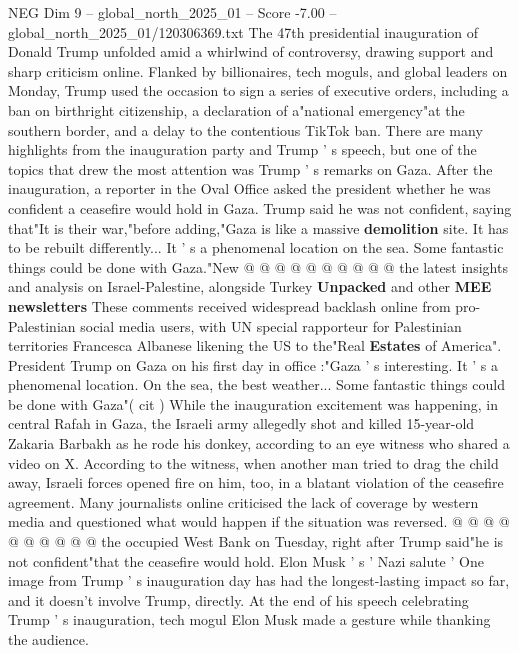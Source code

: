 \begin{textsample}{NEG Dim 9 – global\_north\_2025\_01 – Score -7.00 – global\_north\_2025\_01/120306369.txt}  \label{ex:f9_neg_096}
The 47th presidential inauguration of Donald Trump unfolded amid a whirlwind of controversy, drawing support and sharp criticism online.
Flanked by billionaires, tech moguls, and global leaders on Monday, Trump used the occasion to sign a series of executive orders, including a ban on birthright citizenship, a declaration of a"national emergency"at the southern border, and a delay to the contentious TikTok ban.
There are many highlights from the inauguration party and Trump ' s speech, but one of the topics that drew the most attention was Trump ' s remarks on Gaza.
After the inauguration, a reporter in the Oval Office asked the president whether he was confident a ceasefire would hold in Gaza.
Trump said he was not confident, saying that"It is their war,"before adding,"Gaza is like a massive \textbf{demolition} site.
It has to be rebuilt differently...
It ' s a phenomenal location on the sea.
Some fantastic things could be done with Gaza."New @ @ @ @ @ @ @ @ @ @ the latest insights and analysis on Israel-Palestine, alongside Turkey \textbf{Unpacked} and other \textbf{MEE} \textbf{newsletters} These comments received widespread backlash online from pro-Palestinian social media users, with UN special rapporteur for Palestinian territories Francesca Albanese likening the US to the"Real \textbf{Estates} of America".
President Trump on Gaza on his first day in office :"Gaza ' s interesting.
It ' s a phenomenal location.
On the sea, the best weather...
Some fantastic things could be done with Gaza"( cit ) While the inauguration excitement was happening, in central Rafah in Gaza, the Israeli army allegedly shot and killed 15-year-old Zakaria Barbakh as he rode his donkey, according to an eye witness who shared a video on X.
According to the witness, when another man tried to drag the child away, Israeli forces opened fire on him, too, in a blatant violation of the ceasefire agreement.
Many journalists online criticised the lack of coverage by western media and questioned what would happen if the situation was reversed. @ @ @ @ @ @ @ @ @ @ the occupied West Bank on Tuesday, right after Trump said"he is not confident"that the ceasefire would hold.
Elon Musk ' s ' Nazi salute ' One image from Trump ' s inauguration day has had the longest-lasting impact so far, and it doesn't involve Trump, directly.
At the end of his speech celebrating Trump ' s inauguration, tech mogul Elon Musk made a gesture while thanking the audience.

\end{textsample}
